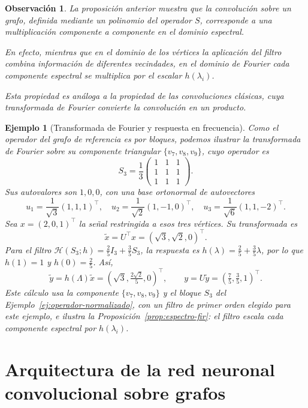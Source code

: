 \documentclass[a4paper,openany,oneside,10pt]{report}
\theoremstyle{pnlTeorema}
\theoremstyle{pnlDefinicion}
\theoremstyle{pnlObservacion}
\newtheorem{ejemplo}{Ejemplo}[section]
\newtheorem{observacion}{Observación}[section]
\begin{document}
\begin{observacion}
La proposición anterior muestra que la convolución sobre un grafo, definida mediante un polinomio del operador \(S\), corresponde a una multiplicación componente a componente en el dominio espectral.

En efecto, mientras que en el dominio de los vértices la aplicación del filtro combina información de diferentes vecindades, en el dominio de Fourier cada componente espectral se multiplica por el escalar \(h(\lambda_i)\).

Esta propiedad es análoga a la propiedad de las convoluciones clásicas, cuya transformada de Fourier convierte la convolución en un producto.
\end{observacion}


\begin{ejemplo}[Transformada de Fourier y respuesta en frecuencia]\label{ej:fourier-filtro}
Como el operador del grafo de referencia es por bloques, podemos ilustrar la transformada de Fourier sobre su componente triangular \(\{v_7,v_8,v_9\}\), cuyo operador es
\[
S_3=\frac13\begin{pmatrix}1&1&1\\1&1&1\\1&1&1\end{pmatrix}.
\]
Sus autovalores son \(1,0,0\), con una base ortonormal de autovectores
\[
u_1=\frac1{\sqrt3}(1,1,1)^\top,\quad
u_2=\frac1{\sqrt2}(1,-1,0)^\top,\quad
u_3=\frac1{\sqrt6}(1,1,-2)^\top.
\]
Sea \(x=(2,0,1)^\top\) la señal restringida a esos tres vértices. Su transformada es
\[
\widetilde x=U^\top x=(\sqrt3,\sqrt2,0)^\top.
\]
Para el filtro \(\mathcal H(S_3;h)=\frac25I_3+\frac35S_3\), la respuesta es \(h(\lambda)=\frac25+\frac35\lambda\), por lo que \(h(1)=1\) y \(h(0)=\frac25\). Así,
\[
\widetilde y=h(\Lambda)\widetilde x=(\sqrt3,\tfrac{2\sqrt2}{5},0)^\top,
\qquad y=U\widetilde y=(\tfrac75,\tfrac35,1)^\top.
\]
Este cálculo usa la componente \(\{v_7,v_8,v_9\}\) y el bloque \(S_3\) del Ejemplo~\ref{ej:operador-normalizado}, con un filtro de primer orden elegido para este ejemplo, e ilustra la Proposición~\ref{prop:espectro-fir}: el filtro escala cada componente espectral por \(h(\lambda_i)\).
\end{ejemplo}

\chapter{Arquitectura de la red neuronal convolucional sobre grafos}
\label{cap:arquitectura-gcnn}
\end{document}
